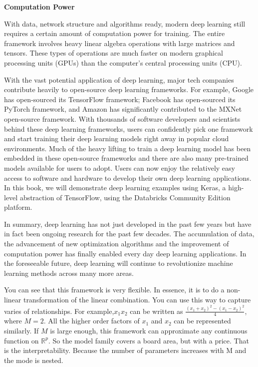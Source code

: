 \documentclass[
  12pt,
]{krantz}
\begin{document}
\textbf{Computation Power}

With data, network structure and algorithms ready, modern deep learning still requires a certain amount of computation power for training. The entire framework involves heavy linear algebra operations with large matrices and tensors. These types of operations are much faster on modern graphical processing units (GPUs) than the computer's central processing units (CPU).

With the vast potential application of deep learning, major tech companies contribute heavily to open-source deep learning frameworks. For example, Google has open-sourced its TensorFlow framework; Facebook has open-sourced its PyTorch framework, and Amazon has significantly contributed to the MXNet open-source framework. With thousands of software developers and scientists behind these deep learning frameworks, users can confidently pick one framework and start training their deep learning models right away in popular cloud environments. Much of the heavy lifting to train a deep learning model has been embedded in these open-source frameworks and there are also many pre-trained models available for users to adopt. Users can now enjoy the relatively easy access to software and hardware to develop their own deep learning applications. In this book, we will demonstrate deep learning examples using Keras, a high-level abstraction of TensorFlow, using the Databricks Community Edition platform.

In summary, deep learning has not just developed in the past few years but have in fact been ongoing research for the past few decades. The accumulation of data, the advancement of new optimization algorithms and the improvement of computation power has finally enabled every day deep learning applications. In the foreseeable future, deep learning will continue to revolutionize machine learning methods across many more areas.

You can see that this framework is very flexible. In essence, it is to do a non-linear transformation of the linear combination. You can use this way to capture varies of relationships. For example,\(x_{1}x_{2}\) can be written as \(\frac{(x_{1}+x_{2})^{2}-(x_{1}-x_{2})^{2}}{4}\), where \(M=2\). All the higher order factors of \(x_1\) and \(x_2\) can be represented similarly. If \(M\) is large enough, this framework can approximate any continuous function on \(\mathbb{R}^{p}\). So the model family covers a board area, but with a price. That is the interpretability. Because the number of parameters increases with M and the mode is nested.
\end{document}
